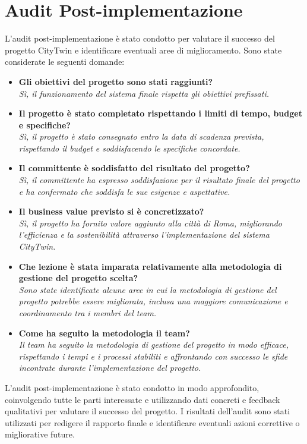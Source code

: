 \section{Audit Post-implementazione}
L'audit post-implementazione è stato condotto per valutare il successo del progetto CityTwin e identificare eventuali aree di miglioramento. Sono state considerate le seguenti domande:
\begin{itemize}
    \item \textbf{Gli obiettivi del progetto sono stati raggiunti?}\\ \textit{Sì, il funzionamento del sistema finale rispetta gli obiettivi prefissati.}
    \item \textbf{Il progetto è stato completato rispettando i limiti di tempo, budget e specifiche?}\\ \textit{Sì, il progetto è stato consegnato entro la data di scadenza prevista, rispettando il budget e soddisfacendo le specifiche concordate.}
    \item \textbf{Il committente è soddisfatto del risultato del progetto?}\\ \textit{Sì, il committente ha espresso soddisfazione per il risultato finale del progetto e ha confermato che soddisfa le sue esigenze e aspettative.}
    \item \textbf{Il business value previsto si è concretizzato?}\\ \textit{Sì, il progetto ha fornito valore aggiunto alla città di Roma, migliorando l'efficienza e la sostenibilità attraverso l'implementazione del sistema CityTwin.}
    \item \textbf{Che lezione è stata imparata relativamente alla metodologia di gestione del progetto scelta?}\\ \textit{Sono state identificate alcune aree in cui la metodologia di gestione del progetto potrebbe essere migliorata, inclusa una maggiore comunicazione e coordinamento tra i membri del team.}
    \item \textbf{Come ha seguito la metodologia il team?}\\ \textit{Il team ha seguito la metodologia di gestione del progetto in modo efficace, rispettando i tempi e i processi stabiliti e affrontando con successo le sfide incontrate durante l'implementazione del progetto.}
\end{itemize}

L'audit post-implementazione è stato condotto in modo approfondito, coinvolgendo tutte le parti interessate e utilizzando dati concreti e feedback qualitativi per valutare il successo del progetto. I risultati dell'audit sono stati utilizzati per redigere il rapporto finale e identificare eventuali azioni correttive o migliorative future.

